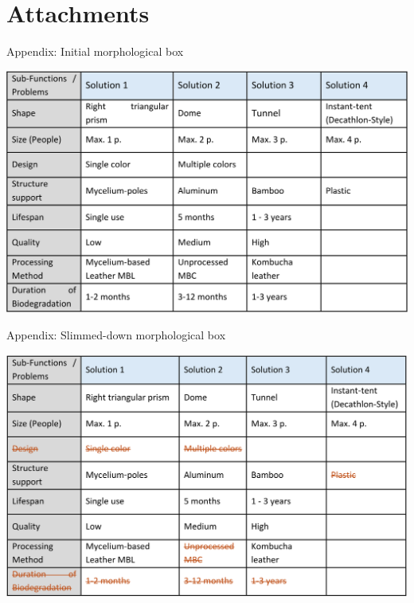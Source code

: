 \documentclass{article}
\begin{document}
\newpage
\section{Attachments}
\label{sec:appendix}
\pagestyle{fancy}
\begin{table}[ht!]
    \centering
    \caption{Appendix: Initial morphological box}
    \label{tab:initial_morph}
    \includegraphics[width=\textwidth]{media/initial_morph.png}
\end{table}

\vfill
\begin{table}[ht!]
    \centering
    \caption{Appendix: Slimmed-down morphological box}
    \label{tab:slimmed_morph}
    \includegraphics[width=\textwidth]{media/slimmed_morph.png}
\end{table}

\newpage
\pagestyle{empty}
\begin{figure}[ht!]
    \centering
    
    \label{pdf:tent-size}
\end{figure}
\addtocounter{figure}{+0}

\newpage
\begin{figure}[ht!]
    \centering
    
    \label{pdf:mockup-size}
\end{figure}
\addtocounter{figure}{+0}
\end{document}
